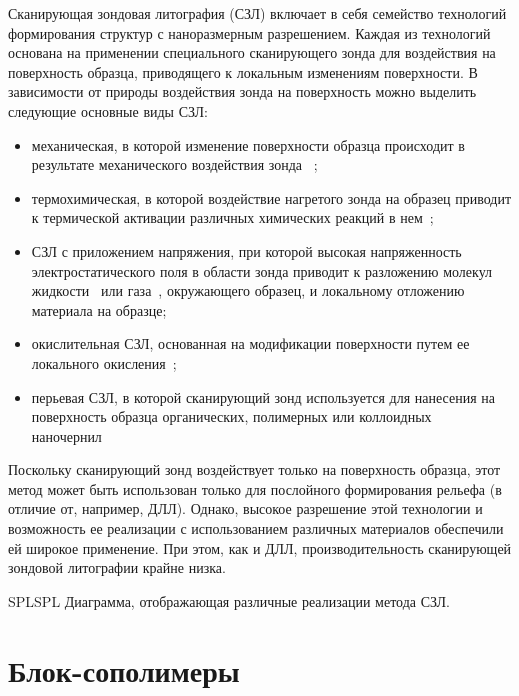 Сканирующая зондовая литография (СЗЛ) включает в себя семейство технологий формирования структур с наноразмерным разрешением. Каждая из технологий основана на применении специального сканирующего зонда для воздействия на поверхность образца, приводящего к локальным изменениям поверхности. В зависимости от природы воздействия зонда на поверхность можно выделить следующие основные виды СЗЛ:
\begin{itemize}
	\item механическая, в которой изменение поверхности образца происходит в результате механического воздействия зонда ~\cite{SPL_mechanical};
	\item  термохимическая, в которой воздействие нагретого зонда на образец приводит к термической активации различных химических реакций в нем~\cite{SPL_termochemical};
	\item СЗЛ с приложением напряжения, при которой высокая напряженность электростатического поля в области зонда приводит к разложению молекул жидкости~\cite{SPL_bias_liquid} или газа~\cite{SPL_bias_gas}, окружающего образец, и локальному отложению материала на образце;
	\item окислительная СЗЛ, основанная на модификации поверхности путем ее локального окисления~\cite{SPL_oxidation};
	\item перьевая СЗЛ, в которой сканирующий зонд используется для нанесения на поверхность образца органических, полимерных или коллоидных наночернил~\cite{SPL_dip_pen_1, SPL_dip_pen_2}
\end{itemize}

Поскольку сканирующий зонд воздействует только на поверхность образца, этот метод может быть использован только для послойного формирования рельефа (в отличие от, например, ДЛЛ). Однако, высокое разрешение этой технологии и возможность ее реализации с использованием различных материалов обеспечили ей широкое применение. При этом, как и ДЛЛ, производительность сканирующей зондовой литографии крайне низка.

\begin{narrowfig}{SPL}{SPL}
	Диаграмма, отображающая различные реализации метода СЗЛ.
\end{narrowfig}


\section{Блок-сополимеры}


